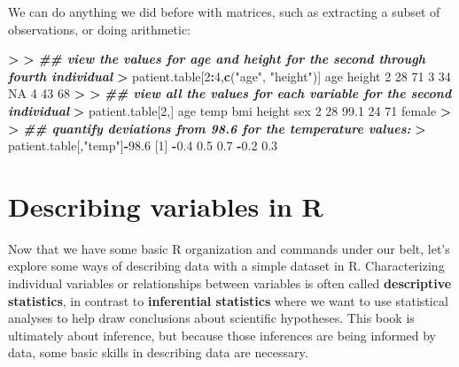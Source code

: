 \documentclass[
]{book}
\newenvironment{Shaded}{\begin{snugshade}}{\end{snugshade}}
\newcommand{\ConstantTok}[1]{\textcolor[rgb]{0.56,0.35,0.01}{#1}}
\newcommand{\DecValTok}[1]{\textcolor[rgb]{0.00,0.00,0.81}{#1}}
\newcommand{\DocumentationTok}[1]{\textcolor[rgb]{0.56,0.35,0.01}{\textbf{\textit{#1}}}}
\newcommand{\ErrorTok}[1]{\textcolor[rgb]{0.64,0.00,0.00}{\textbf{#1}}}
\newcommand{\FloatTok}[1]{\textcolor[rgb]{0.00,0.00,0.81}{#1}}
\newcommand{\FunctionTok}[1]{\textcolor[rgb]{0.13,0.29,0.53}{\textbf{#1}}}
\newcommand{\NormalTok}[1]{#1}
\newcommand{\SpecialCharTok}[1]{\textcolor[rgb]{0.81,0.36,0.00}{\textbf{#1}}}
\newcommand{\StringTok}[1]{\textcolor[rgb]{0.31,0.60,0.02}{#1}}
\begin{document}
We can do anything we did before with matrices, such as extracting a subset of observations, or doing arithmetic:

\begin{Shaded}
\begin{Highlighting}[]
\SpecialCharTok{\textgreater{}} 
\ErrorTok{\textgreater{}} \DocumentationTok{\#\# view the values for age and height for the second through fourth individual}
\ErrorTok{\textgreater{}}\NormalTok{ patient.table[}\DecValTok{2}\SpecialCharTok{:}\DecValTok{4}\NormalTok{,}\FunctionTok{c}\NormalTok{(}\StringTok{"age"}\NormalTok{, }\StringTok{"height"}\NormalTok{)]}
\NormalTok{  age height}
\DecValTok{2}  \DecValTok{28}     \DecValTok{71}
\DecValTok{3}  \DecValTok{34}     \ConstantTok{NA}
\DecValTok{4}  \DecValTok{43}     \DecValTok{68}
\SpecialCharTok{\textgreater{}} 
\ErrorTok{\textgreater{}} \DocumentationTok{\#\# view all the values for each variable for the second individual}
\ErrorTok{\textgreater{}}\NormalTok{ patient.table[}\DecValTok{2}\NormalTok{,]}
\NormalTok{  age temp bmi height    sex}
\DecValTok{2}  \DecValTok{28} \FloatTok{99.1}  \DecValTok{24}     \DecValTok{71}\NormalTok{ female}
\SpecialCharTok{\textgreater{}} 
\ErrorTok{\textgreater{}} \DocumentationTok{\#\# quantify deviations from 98.6 for the temperature values:}
\ErrorTok{\textgreater{}}\NormalTok{ patient.table[,}\StringTok{"temp"}\NormalTok{]}\SpecialCharTok{{-}}\FloatTok{98.6}
\NormalTok{[}\DecValTok{1}\NormalTok{] }\SpecialCharTok{{-}}\FloatTok{0.4}  \FloatTok{0.5}  \FloatTok{0.7} \SpecialCharTok{{-}}\FloatTok{0.2}  \FloatTok{0.3}
\end{Highlighting}
\end{Shaded}

\section{Describing variables in R}\label{describing-variables-in-r}

Now that we have some basic R organization and commands under our belt, let's explore some ways of describing data with a simple dataset in R. Characterizing individual variables or relationships between variables is often called \textbf{descriptive statistics}, in contrast to \textbf{inferential statistics} where we want to use statistical analyses to help draw conclusions about scientific hypotheses. This book is ultimately about inference, but because those inferences are being informed by data, some basic skills in describing data are necessary.
\end{document}
